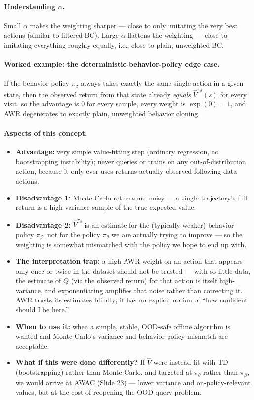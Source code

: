 \documentclass[11pt]{article}
\begin{document}
\paragraph{Understanding $\alpha$.}
Small $\alpha$ makes the weighting sharper --- close to only imitating the very best
actions (similar to filtered BC). Large $\alpha$ flattens the weighting --- close to
imitating everything roughly equally, i.e., close to plain, unweighted BC.

\paragraph{Worked example: the deterministic-behavior-policy edge case.}
If the behavior policy $\pi_\beta$ always takes exactly the same single action in a
given state, then the observed return from that state already \emph{equals}
$\hat V^{\pi_\beta}(s)$ for every visit, so the advantage is $0$ for every sample, every
weight is $\exp(0)=1$, and AWR degenerates to exactly plain, unweighted behavior cloning.

\paragraph{Aspects of this concept.}
\begin{itemize}
\item \textbf{Advantage:} very simple value-fitting step (ordinary regression, no
bootstrapping instability); never queries or trains on any out-of-distribution action,
because it only ever uses returns actually observed following data actions.
\item \textbf{Disadvantage 1:} Monte Carlo returns are noisy --- a single trajectory's
full return is a high-variance sample of the true expected value.
\item \textbf{Disadvantage 2:} $\hat V^{\pi_\beta}$ is an estimate for the (typically
weaker) behavior policy $\pi_\beta$, not for the policy $\pi_\theta$ we are actually
trying to improve --- so the weighting is somewhat mismatched with the policy we hope to
end up with.
\item \textbf{The interpretation trap:} a high AWR weight on an action that appears only
once or twice in the dataset should not be trusted --- with so little data, the estimate
of $Q$ (via the observed return) for that action is itself high-variance, and
exponentiating amplifies that noise rather than correcting it. AWR trusts its estimates
blindly; it has no explicit notion of ``how confident should I be here.''
\item \textbf{When to use it:} when a simple, stable, OOD-safe offline algorithm is
wanted and Monte Carlo's variance and behavior-policy mismatch are acceptable.
\item \textbf{What if this were done differently?} If $\hat V$ were instead fit with
TD (bootstrapping) rather than Monte Carlo, and targeted at $\pi_\theta$ rather than
$\pi_\beta$, we would arrive at AWAC (Slide 23) --- lower variance and on-policy-relevant
values, but at the cost of reopening the OOD-query problem.
\end{itemize}
\end{document}
